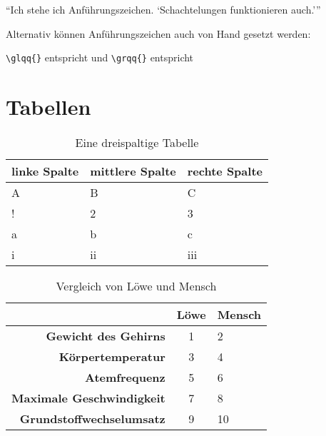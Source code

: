 \enquote{Ich stehe ich Anführungszeichen. \enquote{Schachtelungen funktionieren auch.}}

Alternativ können Anführungszeichen auch von Hand gesetzt werden:

\texttt{\textbackslash glqq\{\}} entspricht \glqq{} und \newline
\texttt{\textbackslash grqq\{\}} entspricht \grqq{}

\section{Tabellen}

\begin{table}[ht]
	\centering
	\caption{Eine dreispaltige Tabelle}
	\begin{tabular}{lll}
		\hline
		\textbf{linke Spalte} & \textbf{mittlere Spalte} & \textbf{rechte Spalte} \\
		\hline
		A & B & C \\
		! & 2 & 3 \\
		a & b & c \\
		i & ii & iii \\
		\hline
	\end{tabular}
	\label{tabelle:Nummer1}
\end{table}

\begin{table}[ht]
	\centering
	\caption{Vergleich von Löwe und Mensch}
	\begin{tabular}{|r|c|l|}
		\hline
		\textbf{}                          & \textbf{Löwe}  & \textbf{Mensch}\\ \hline
		\textbf{Gewicht des Gehirns}       & 1              & 2\\
		\textbf{Körpertemperatur}          & 3              & 4\\
		\textbf{Atemfrequenz}              & 5              & 6\\
		\textbf{Maximale Geschwindigkeit}  & 7              & 8\\
		\textbf{Grundstoffwechselumsatz}   & 9              & 10\\\hline
	\end{tabular}
	\label{tabelle:Nummer2}
\end{table}

